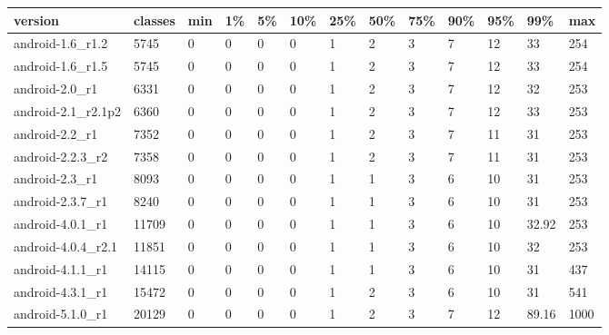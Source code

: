 \begin{tabular}{|l|l|l|l|l|l|l|l|l|l|l|l|l|}
\hline
version&classes&min&1\%&5\%&10\%&25\%&50\%&75\%&90\%&95\%&99\%&max\\
\hline
android-1.6\_r1.2&5745&0&0&0&0&1&2&3&7&12&33&254\\
\hline
android-1.6\_r1.5&5745&0&0&0&0&1&2&3&7&12&33&254\\
\hline
android-2.0\_r1&6331&0&0&0&0&1&2&3&7&12&32&253\\
\hline
android-2.1\_r2.1p2&6360&0&0&0&0&1&2&3&7&12&33&253\\
\hline
android-2.2\_r1&7352&0&0&0&0&1&2&3&7&11&31&253\\
\hline
android-2.2.3\_r2&7358&0&0&0&0&1&2&3&7&11&31&253\\
\hline
android-2.3\_r1&8093&0&0&0&0&1&1&3&6&10&31&253\\
\hline
android-2.3.7\_r1&8240&0&0&0&0&1&1&3&6&10&31&253\\
\hline
android-4.0.1\_r1&11709&0&0&0&0&1&1&3&6&10&32.92&253\\
\hline
android-4.0.4\_r2.1&11851&0&0&0&0&1&1&3&6&10&32&253\\
\hline
android-4.1.1\_r1&14115&0&0&0&0&1&1&3&6&10&31&437\\
\hline
android-4.3.1\_r1&15472&0&0&0&0&1&2&3&6&10&31&541\\
\hline
android-5.1.0\_r1&20129&0&0&0&0&1&2&3&7&12&89.16&1000\\
\hline
\end{tabular}
